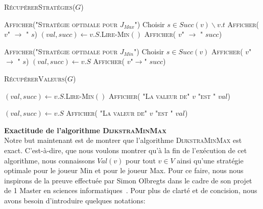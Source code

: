 \begin{algorithm}
	\caption{\textsc{RécupérerStratégies}($G$)}
	\label{algo:recupStrat}
	\begin{algorithmic}[1]
	
	\STATE \textsc{Afficher("Stratégie optimale pour $J_{Max}$")}
			\STATE Choisir $s \in Succ(v) \backslash v.t$
			\STATE \textsc{Afficher( $v$" $\rightarrow $ " $s$)}
		\ELSE
			\STATE $(val,succ) \leftarrow v.S.$\textsc{Lire-Min}$()$
			\STATE \textsc{Afficher( $v$" $\rightarrow$ " $succ$)}
		\ENDIF
	\ENDFOR
	
	\STATE \textsc{Afficher("Stratégie optimale pour $J_{Min}$")}
			\STATE Choisir $s \in Succ(v)$
			\STATE \textsc{Afficher( $v$" $ \rightarrow$ " $s$)}
		\ELSE	
			\STATE $(val,succ) \leftarrow v.S$
			\STATE \textsc{Afficher( $v $"$ \rightarrow $" $succ$)}
		\ENDIF
	\ENDFOR
	
	\end{algorithmic}
\end{algorithm}

\begin{algorithm}
	\caption{\textsc{RécupérerValeurs}($G$)}
	\label{algo:recupVal}
	\begin{algorithmic}[1]
	
	\FORALL{$v \in V_2$} 
		\STATE $(val,succ) \leftarrow v.S.$\textsc{Lire-Min}$()$
		\STATE \textsc{Afficher( "La valeur de" $v$ "est " $val$)}
	\ENDFOR
	
	\FORALL{$v \in V_1$} 
		\STATE $(val,succ) \leftarrow v.S$
		\STATE \textsc{Afficher( "La valeur de" $v$ "est " $val$)}
	\ENDFOR
	
	
	\end{algorithmic}
\end{algorithm}


\FloatBarrier
	



\noindent\textbf{Exactitude de l'algorithme \textsc{DijkstraMinMax}}\\

Notre but maintenant est de montrer que l'algorithme \textsc{DijkstraMinMax} est exact. C'est-à-dire, que nous voulons montrer qu'à la fin de l'exécution de cet algorithme, nous connaissons $Val(v)$ pour tout $v\in V$ ainsi qu'une stratégie optimale pour le joueur Min et pour le joueur Max.
Pour ce faire, nous nous inspirons de la preuve effectuée par Simon Olbregts dans le cadre de son projet de 1 Master en sciences informatiques~\cite{simon}. 
Pour plus de clarté et de concision, nous avons besoin d'introduire quelques notations:\\

